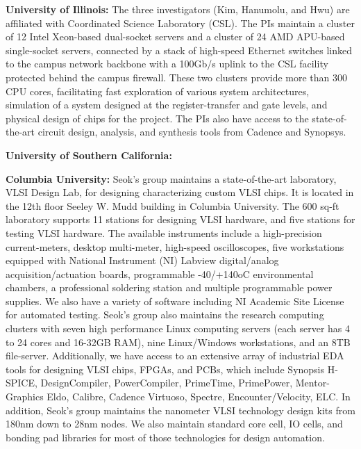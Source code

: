 \noindent
\textbf{University of Illinois:}
The three investigators (Kim, Hanumolu, and Hwu) are affiliated with Coordinated Science Laboratory (CSL). 
The PIs maintain a cluster of 12 Intel Xeon-based dual-socket servers and a cluster of 24 AMD APU-based single-socket servers, connected by a stack of high-speed Ethernet switches linked to the campus network backbone with a 100Gb/s uplink to the CSL facility protected behind the campus firewall.
These two clusters provide more than 300 CPU cores, facilitating fast exploration of various system architectures, simulation of a system designed at the register-transfer and gate levels, and physical design of chips for the project.
The PIs also have access to the state-of-the-art circuit design, analysis, and synthesis tools from Cadence and Synopsys.

\noindent
\textbf{University of Southern California:}

\noindent
\textbf{Columbia University:} 
Seok’s group maintains a state-of-the-art laboratory, VLSI Design Lab, for designing characterizing custom VLSI chips. It is located in the 12th floor Seeley W. Mudd building in Columbia University. The 600 sq-ft laboratory supports 11 stations for designing VLSI hardware, and five stations for testing VLSI hardware. The available instruments include a high-precision current-meters, desktop multi-meter, high-speed oscilloscopes, five workstations equipped with National Instrument (NI) Labview digital/analog acquisition/actuation boards, programmable -40/+140oC environmental chambers, a professional soldering station and multiple programmable power supplies. We also have a variety of software including NI Academic Site License for automated testing. 
Seok’s group also maintains the research computing clusters with seven high performance Linux computing servers (each server has 4 to 24 cores and 16-32GB RAM), nine Linux/Windows workstations, and an 8TB file-server. Additionally, we have access to an extensive array of industrial EDA tools for designing VLSI chips, FPGAs, and PCBs, which include Synopsis H-SPICE, DesignCompiler, PowerCompiler, PrimeTime, PrimePower, Mentor-Graphics Eldo, Calibre, Cadence Virtuoso, Spectre, Encounter/Velocity, ELC. In addition, Seok’s group maintains the nanometer VLSI technology design kits from 180nm down to 28nm nodes. We also maintain standard core cell, IO cells, and bonding pad libraries for most of those technologies for design automation. 

